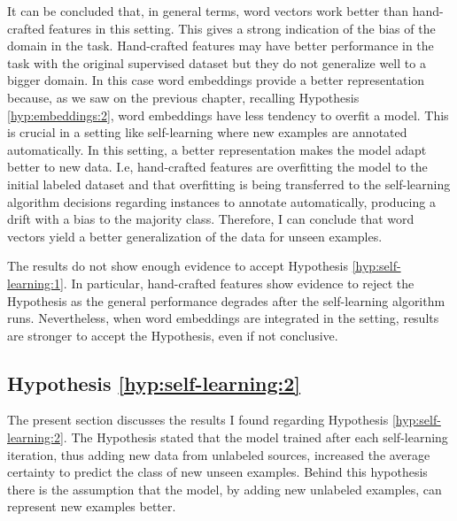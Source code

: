 It can be concluded that, in general terms, word vectors work better than
hand-crafted features in this setting. This gives a strong indication of the
bias of the domain in the task. Hand-crafted features may have better
performance in the task with the original supervised dataset but they do not
generalize well to a bigger domain. In this case word embeddings provide a
better representation because, as we saw on the previous chapter, recalling
Hypothesis \ref{hyp:embeddings:2}, word embeddings have less tendency to
overfit a model. This is crucial in a setting like self-learning where new
examples are annotated automatically. In this setting, a better representation
makes the model adapt better to new data. I.e, hand-crafted features are
overfitting the model to the initial labeled dataset and that overfitting is
being transferred to the self-learning algorithm decisions regarding instances
to annotate automatically, producing a drift with a bias to the majority class.
Therefore, I can conclude that word vectors yield a better generalization of
the data for unseen examples.

The results do not show enough evidence to accept Hypothesis
\ref{hyp:self-learning:1}. In particular, hand-crafted features show evidence
to reject the Hypothesis as the general performance degrades after the
self-learning algorithm runs. Nevertheless, when word embeddings are integrated
in the setting, results are stronger to accept the Hypothesis, even if not
conclusive.

\subsection{Hypothesis \ref{hyp:self-learning:2}}\label{sec:self-learning:hyp:2}

The present section discusses the results I found regarding Hypothesis
\ref{hyp:self-learning:2}. The Hypothesis stated that the model trained after
each self-learning iteration, thus adding new data from unlabeled sources,
increased the average certainty to predict the class of new unseen examples.
Behind this hypothesis there is the assumption that the model, by adding new
unlabeled examples, can represent new examples better.

